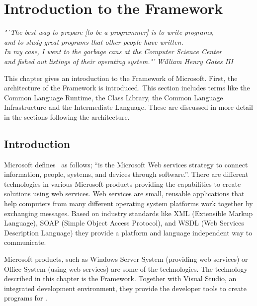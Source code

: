 \chapter{Introduction to the \dotNET Framework}
\begin{flushright}
\textit{"`The best way to prepare [to be a programmer] is to write programs,}\\
\textit{and to study great programs that other people have written.}\\
\textit{In my case, I went to the garbage cans at the Computer Science Center}\\
\textit{and fished out listings of their operating system."'}
\textit{William Henry Gates III}\\
\end{flushright}

\label{chp:dotnet_platform}

This chapter gives an introduction to the \dotNET Framework of Microsoft. First, the architecture of the \dotNET Framework is introduced. This section includes terms like the Common Language Runtime, the \dotNET Class Library, the Common Language Infrastructure and the Intermediate Language. These are discussed in more detail in the sections following the architecture.

%
%
\section{Introduction}
Microsoft defines~\cite{Microsoft03-5} \dotNET as follows; ``\dotNET is the Microsoft Web services strategy to connect information, people, systems, and devices through software.''. There are different \dotNET technologies in various Microsoft products providing the capabilities to create solutions using web services. 
Web services are small, reusable applications that help computers from many different operating system platforms work together by exchanging messages. Based on industry standards like XML (Extensible Markup Language), SOAP (Simple Object Access Protocol), and WSDL (Web Services Description Language) they provide a platform and language independent way to communicate.

Microsoft products, such as Windows Server System (providing web services) or Office System (using web services) are some of the \dotNET technologies. The technology described in this chapter is the \dotNET Framework. Together with Visual Studio, an integrated development environment, they provide the developer tools to create programs for \dotNET. 

